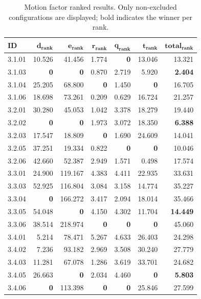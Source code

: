 \begin{table}[!t]
\centering
\footnotesize
\caption{Motion factor ranked results. Only non-excluded configurations are displayed; bold indicates the winner per rank.}
\label{tab:motion_ranked}
\begin{tabular}{@{}lrrrrrr@{}}
\hline
    \textbf{ID} & $\bm{d}_{\textbf{rank}}$ & $\bm{e}_{\textbf{rank}}$ & $\bm{r}_{\textbf{rank}}$ & $\bm{q}_{\textbf{rank}}$ & $\bm{t}_{\textbf{rank}}$ & $\textbf{total}_{\textbf{rank}}$ \\
\hline
    3.1.01 & 10.526 & 41.456 & 1.774 & \textbf{0} & 13.046 & 13.321 \\
    3.1.03 & \textbf{0} & \textbf{0} & 0.870 & 2.719 & 5.920 & \textbf{2.404} \\
    3.1.04 & 25.205 & 68.800 & \textbf{0} & 1.450 & \textbf{0} & 16.705 \\
    3.1.06 & 18.698 & 73.261 & 0.209 & 0.629 & 16.724 & 21.257 \\
    \noalign{\smallskip}
    3.2.01 & 30.280 & 45.053 & 1.042 & 3.378 & 18.279 & 19.440 \\
    3.2.02 & \textbf{0} & \textbf{0} & 1.973 & 3.072 & 18.350 & \textbf{6.388} \\
    3.2.03 & 17.547 & 18.809 & \textbf{0} & 1.690 & 24.609 & 14.041 \\
    3.2.05 & 37.251 & 19.334 & 0.822 & \textbf{0} & \textbf{0} & 10.046 \\
    3.2.06 & 42.660 & 52.387 & 2.949 & 1.571 & 0.498 & 17.574 \\
    \noalign{\smallskip}
    3.3.01 & 24.900 & 119.167 & 4.383 & 4.411 & 22.935 & 33.631 \\
    3.3.03 & 52.925 & 116.804 & 3.084 & 3.158 & 14.774 & 35.227 \\
    3.3.04 & \textbf{0} & 166.272 & 3.417 & 2.094 & 18.014 & 35.466 \\
    3.3.05 & 54.048 & \textbf{0} & 4.150 & 4.302 & 11.704 & \textbf{14.449} \\
    3.3.06 & 38.514 & 218.974 & \textbf{0} & \textbf{0} & \textbf{0} & 45.060 \\
    \noalign{\smallskip}
    3.4.01 & 5.214 & 78.471 & 5.267 & 4.633 & 26.403 & 24.298 \\
    3.4.02 & 7.236 & 93.182 & 2.969 & 3.508 & 30.240 & 27.779 \\
    3.4.03 & 11.281 & 67.078 & 1.286 & 3.619 & 33.701 & 24.682 \\
    3.4.05 & 26.663 & \textbf{0} & 2.034 & 4.460 & \textbf{0} & \textbf{5.803} \\
    3.4.06 & \textbf{0} & 113.398 & \textbf{0} & \textbf{0} & 25.846 & 27.599 \\
\hline
\end{tabular}
\end{table}